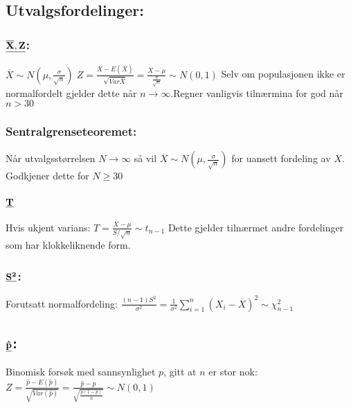 \documentclass[8pt,a4paper,twocolumn,twoside]{article}
\begin{document}
\subsection*{Utvalgsfordelinger:}
\subsubsection*{$\bold{\underline{\overline{X},Z}}$:}
$\overline{X}\sim N\left(\mu,\frac{\sigma}{\sqrt{n}}\right)\; Z=\frac{\overline{X}-E(\overline{X})}{\sqrt{Var{\overline{X}}}}=\frac{\overline{X}-\mu}{\frac{\sigma}{\sqrt{n}}}\sim N(0,1)$
Selv om populasjonen ikke er normalfordelt gjelder dette når $n\to\infty$.Regner vanligvis tilnærmina for god når $n>30$
\subsubsection*{Sentralgrenseteoremet:}
Når utvalgsstørrelsen $N\to\infty$ så vil $\overline{X}\sim N\left(\mu,\frac{\sigma}{\sqrt{n}}\right)$ for uansett fordeling av $X$. Godkjener dette for $N\geq 30$
\subsubsection*{$\bold{\underline{T}}$}
Hvis ukjent varians:
$T=\frac{\overline{X}-\mu}{S/\sqrt{n}}\sim t_{n-1}$
Dette gjelder tilnærmet andre fordelinger som har klokkeliknende form.
\subsubsection*{$\bold{\underline{S^2}}$:}
Forutsatt normalfordeling:
$\frac{(n-1)S^2}{\sigma^2}=\frac{1}{\sigma^2}\sum_{i=1}^n(X_i-\overline{X})^2\sim\chi_{n-1}^2$
\subsection*{$\bold{\underline{\hat{p}}}$:}
Binomisk forsøk med sannsynlighet $p$, gitt at $n$ er stor nok:
$Z=\frac{\hat{p}-E(\hat{p})}{\sqrt{Var(\hat{p})}}=\frac{\hat{p}-p}{\sqrt{\frac{p(1-p)}{n}}}\sim N(0,1)$
\end{document}
